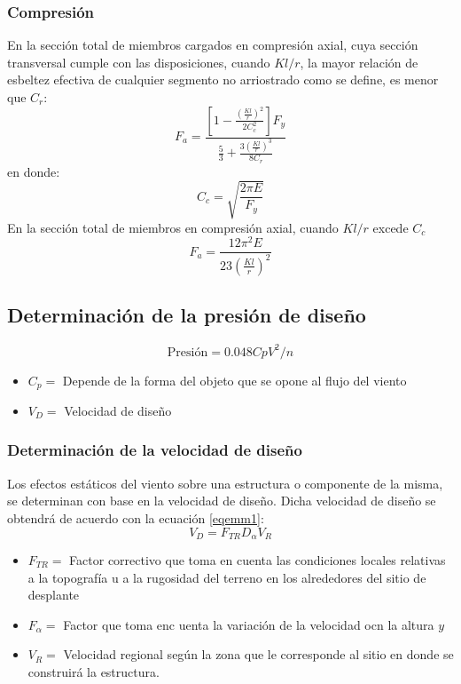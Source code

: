 \subsubsection{Compresión}
En la sección total de miembros cargados en compresión axial, cuya sección transversal cumple con las disposiciones, cuando $Kl/r$, la mayor relación de esbeltez efectiva de cualquier segmento no arriostrado como se define, es menor que $C_r$:
\begin{equation}
  F_a = \frac{\left[1 - \frac{\left(\frac{Kl}{r}\right)^2}{2C_c^2} \right]F_y}{ \frac{5}{3} + \frac{3\left(\frac{Kl}{r}\right)^3}{8C_r} }
\end{equation}
en donde:
\begin{equation}
  C_c = \sqrt{\frac{2\pi E}{F_y}} 
\end{equation}
En la sección total de miembros en compresión axial, cuando $Kl/r$ excede $C_c$
\begin{equation}
  F_a = \frac{12 \pi^2 E}{23\left(\frac{Kl}{r}\right)^2}
\end{equation}
\subsection{Determinación de la presión de diseño}

\begin{equation}
    \text{Presión} = 0.048 Cp V^2/n
\end{equation}
\begin{notation}
    \begin{itemize}
        \item $C_p=$ Depende de la forma del objeto que se opone al flujo del viento 
        \item $V_D=$ Velocidad de diseño
    \end{itemize}
\end{notation}
\subsubsection{Determinación de la velocidad de diseño}
Los efectos estáticos del viento sobre una estructura o componente de la misma, se determinan con base en la velocidad de diseño. Dicha velocidad de diseño se obtendrá de acuerdo con la ecuación \eqref{eqemm1}:
\begin{equation}
    V_D = F_{TR} D_{\alpha}V_R
    \label{eqemm1}
\end{equation}
\begin{notation}
    \begin{itemize}
        \item $F_{TR}=$ Factor  correctivo que toma en cuenta las condiciones locales relativas a la topografía u a la rugosidad del terreno en los alrededores del sitio de desplante
        \item $F_{\alpha}=$ Factor que toma enc uenta la variación de la velocidad ocn la altura $y$
        \item $V_R=$ Velocidad regional según la zona que le corresponde al sitio en donde se construirá la estructura.
    \end{itemize}
\end{notation}

